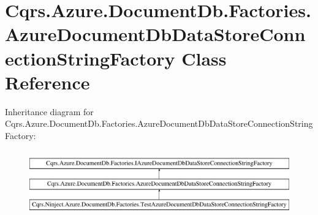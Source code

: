 \hypertarget{classCqrs_1_1Azure_1_1DocumentDb_1_1Factories_1_1AzureDocumentDbDataStoreConnectionStringFactory}{}\section{Cqrs.\+Azure.\+Document\+Db.\+Factories.\+Azure\+Document\+Db\+Data\+Store\+Connection\+String\+Factory Class Reference}
\label{classCqrs_1_1Azure_1_1DocumentDb_1_1Factories_1_1AzureDocumentDbDataStoreConnectionStringFactory}
Inheritance diagram for Cqrs.\+Azure.\+Document\+Db.\+Factories.\+Azure\+Document\+Db\+Data\+Store\+Connection\+String\+Factory\+:\begin{figure}[H]
\begin{center}
\leavevmode
\includegraphics[height=2.847458cm]{classCqrs_1_1Azure_1_1DocumentDb_1_1Factories_1_1AzureDocumentDbDataStoreConnectionStringFactory}
\end{center}
\end{figure}
